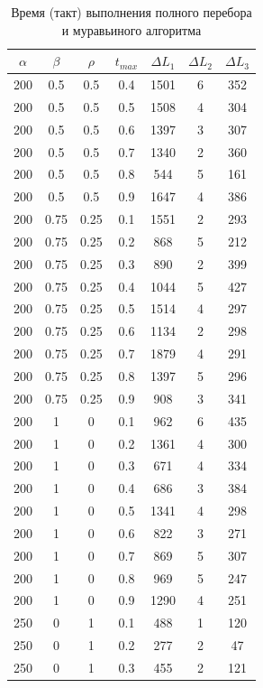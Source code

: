 \documentclass[a4paper,oneside,14pt]{extreport}
\begin{document}
\begin{table}[h]
\caption{Время (такт) выполнения полного перебора и муравьиного алгоритма}
\label{tbl:only}
\begin{center}
	\begin{tabular}{|c|c|c|c|c|c|c|}
		\hline
		$\alpha$ & $\beta$ & $\rho$ &  $t_{max}$ & $\Delta L_{1}$ & $\Delta L_{2}$ & $\Delta L_{3}$\\
		\hline
		200 & 0.5 & 0.5 & 0.4 & 1501 & 6 & 352 \\
		200 & 0.5 & 0.5 & 0.5 & 1508 & 4 & 304 \\
		200 & 0.5 & 0.5 & 0.6 & 1397 & 3 & 307 \\
		200 & 0.5 & 0.5 & 0.7 & 1340 & 2 & 360 \\
		200 & 0.5 & 0.5 & 0.8 & 544 & 5 & 161 \\
		200 & 0.5 & 0.5 & 0.9 & 1647 & 4 & 386 \\
		200 & 0.75 & 0.25 & 0.1 & 1551 & 2 & 293 \\
		200 & 0.75 & 0.25 & 0.2 & 868 & 5 & 212 \\
		200 & 0.75 & 0.25 & 0.3 & 890 & 2 & 399 \\
		200 & 0.75 & 0.25 & 0.4 & 1044 & 5 & 427 \\
		200 & 0.75 & 0.25 & 0.5 & 1514 & 4 & 297 \\
		200 & 0.75 & 0.25 & 0.6 & 1134 & 2 & 298 \\
		200 & 0.75 & 0.25 & 0.7 & 1879 & 4 & 291 \\
		200 & 0.75 & 0.25 & 0.8 & 1397 & 5 & 296 \\
		200 & 0.75 & 0.25 & 0.9 & 908 & 3 & 341 \\
		200 & 1 & 0 & 0.1 & 962 & 6 & 435 \\
		200 & 1 & 0 & 0.2 & 1361 & 4 & 300 \\
		200 & 1 & 0 & 0.3 & 671 & 4 & 334 \\
		200 & 1 & 0 & 0.4 & 686 & 3 & 384 \\
		200 & 1 & 0 & 0.5 & 1341 & 4 & 298 \\
		200 & 1 & 0 & 0.6 & 822 & 3 & 271 \\
		200 & 1 & 0 & 0.7 & 869 & 5 & 307 \\
		200 & 1 & 0 & 0.8 & 969 & 5 & 247 \\
		200 & 1 & 0 & 0.9 & 1290 & 4 & 251 \\
		250 & 0 & 1 & 0.1 & 488 & 1 & 120 \\
		250 & 0 & 1 & 0.2 & 277 & 2 & 47 \\
		250 & 0 & 1 & 0.3 & 455 & 2 & 121 \\

\end{tabular}
\end{center}
\end{table}
\end{document}
